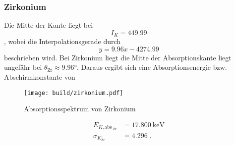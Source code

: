 \subsubsection{Zirkonium}
Die Mitte der Kante liegt bei 
\begin{equation*}
    I_K =  449.99
\end{equation*}
, wobei die Interpolationsgerade durch 
\begin{equation*}
    y = 9.96x -4274.99
\end{equation*}
beschrieben wird.
Bei Zirkonium liegt die Mitte der Absorptionskante liegt ungefähr bei $\theta_\text{Zr} \approx \ang{9.96;;}$. 
Daraus ergibt sich eine Absorptionsenergie bzw. Abschirmkonstante von 
\begin{figure}
    \centering
    \caption{Absorptionsspektrum von Zirkonium}
    \label{fig:Zirkonium}
    \texttt{[image: build/zirkonium.pdf]}
\end{figure}
\begin{align*}
    E_{K, \text{abs}_\text{ Zr}}  &= \SI{17.800}{\kilo\electronvolt} \\
    \sigma_{K_\text{Zr}}         &= \num{4.296} \; \text{.}
\end{align*}
\FloatBarrier
